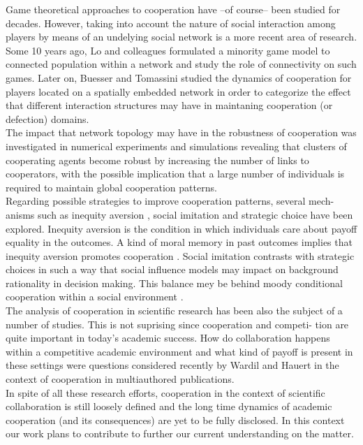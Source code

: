 Game theoretical approaches to cooperation have –of course– been
studied for decades. However, taking into account the nature of social
interaction among players by means of an undelying social network is a
more recent area of research. Some 10 years ago, Lo and colleagues
\cite{Lo2004} formulated a minority game model to connected population
within a network and study the role of connectivity on such games.
Later on, Buesser and Tomassini \cite{Buesser2012} studied the
dynamics of cooperation for players located on a spatially embedded
network in order to categorize the effect that different interaction
structures may have in maintaning cooperation (or defection) domains.\\

The impact that network topology may have in the robustness of
cooperation was investigated in numerical experiments and simulations
\cite{Ichinose2013} revealing that clusters of cooperating agents become robust by
increasing the number of links to cooperators, with the possible
implication that a large number of individuals is required to maintain
global cooperation patterns.\\

Regarding possible strategies to improve cooperation patterns, several mech-
anisms such as inequity aversion \cite{Ahmed2014}, social imitation
and strategic choice \cite{Vilone2014} have been explored. Inequity
aversion is the condition in which individuals care about payoff
equality in the outcomes. A kind of moral memory in past outcomes
implies that inequity aversion promotes cooperation
\cite{Ahmed2014}. Social imitation contrasts with strategic choices
in such a way that social influence models may impact on background
rationality in decision making. This balance mey be behind moody
conditional cooperation within a social environment \cite{Vilone2014}.\\

The analysis of cooperation in scientific research has been also the subject
of a number of studies. This is not suprising since cooperation and competi-
tion are quite important in today’s academic success. How do collaboration
happens within a competitive academic environment and what kind of payoff
is present in these settings were questions considered recently by Wardil and
Hauert \cite{Wardil2015} in the context of cooperation in multiauthored
publications.\\

In spite of all these research efforts, cooperation in the context of scientific
collaboration is still loosely defined and the long time dynamics of academic
cooperation (and its consequences) are yet to be fully disclosed. In this context
our work plans to contribute to further our current understanding on the
matter.



